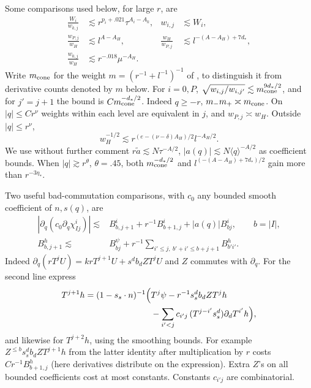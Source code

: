 Some comparisons used below, for large \(r\), are
\begin{equation}
\label{fs:G2}
\begin{aligned}
 \frac{W_i}{w_{k,j}}&\lesssim r^{p_i+.021}\tau^{A_i-A_k},
 &w_{i,j}&\lesssim W_i,\\
 \frac{w_{P,j}}{w_H}&\lesssim l^{A-A_H},
 &\frac{w_H}{w_{P,j}}&\lesssim l^{-(A-A_H)+7d_*},\\
 \frac{w_{0,j}}{w_H}&\lesssim r^{-.018}\mu^{-A_H}.
\end{aligned}
\end{equation}
Write \(m_{\rm cone}\) for the weight \(m=(r^{-1}+l^{-1})^{-1}\) of , to distinguish it from derivative counts denoted by \(m\) below. For \(i=0,P\), \(\sqrt{w_{i,j}/w_{i,j'}}\lesssim m_{\rm cone}^{9d_*/2}\), and for \(j'=j+1\) the bound is \(C m_{\rm cone}^{-d_*/2}\). Indeed \(q\ge-r\), \(m_-m_+\asymp m_{\rm cone}\). On \(|q|\le C r^\nu\) weights within each level are equivalent in \(j\), and \(w_{P,j}\asymp w_H\). Outside \(|q|\le r^\nu\),
\[
 w_H^{-1/2}\lesssim r^{(e-(\nu-\delta)A_H)/2}l^{-A_H/2}.
\]
We use without further comment \(r\widetilde a\lesssim N\tau^{-A/2}\), \(|a(q)|\lesssim N\langle q\rangle^{-A/2}\) as coefficient bounds. When \(|q|\gtrsim r^\theta\), \(\theta=.45\), both \(m_{\rm cone}^{-d_*/2}\) and \(l^{(-(A-A_H)+7d_*)/2}\) gain more than \(r^{-3\eta_*}\).

Two useful bad-commutation comparisons, with \(c_0\) any bounded smooth coefficient of \(n,s(q)\), are
\begin{equation}
\label{fs:G3}
\begin{split}
 |\partial_q(c_0\partial_q\chi^i_{I j})| \lesssim&
 B^i_{b,j+1}+r^{-1}B^i_{b+1,j}+|a(q)|B^i_{b j},\qquad b=|I|,\\
 B^h_{b,j+1}\lesssim&
 B^\psi_{b j}+r^{-1}
             \sum_{i'\le j,\ b'+i'\le b+j+1} B^h_{b' i'} .
 \end{split}
\end{equation}
Indeed \(\partial_q(rT^j U)=krT^{j+1}U+s^d b_d Z T^j U\) and \(Z\) commutes with \(\partial_q\). For the second line express
\begin{equation}
\label{fs:G4}
\begin{aligned}
T^{j+1} h=(1-s_s\cdot n)^{-1}
    \Bigl(&T^j\psi-r^{-1}s_s^d b_d Z T^j h\\
           &-\sum_{i'<j}c_{i'j}\,(T^{j-i'}s_s^d)
                                  \partial_d T^{i'}h\Bigr),
\end{aligned}
\end{equation}
and likewise for \(T^{j+2}h\), using the smoothing bounds. For example \(Z^{\le b}s_s^d b_d ZT^{j+1}h\) from the latter identity after multiplication by \(r\) costs \(C r^{-1}B^h_{b+1,j}\) (here derivatives distribute on the expression). Extra \(Z\)'s on all bounded coefficients cost at most constants. Constants \(c_{i'j}\) are combinatorial.

